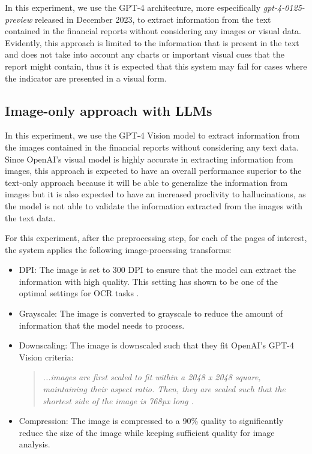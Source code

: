 \documentclass[english, 12pt, a4paper, elec, utf8, a-2b, online]{aaltothesis}
\begin{document}
In this experiment, we use the \ac{GPT}-4 architecture, more especifically \textit{gpt-4-0125-preview} released in December 2023, to extract information from the text contained in the financial reports without considering any images or visual data.
Evidently, this approach is limited to the information that is present in the text and does not take into account any charts or important visual cues that the report might contain, thus it is expected that this system may fail for cases where the indicator are presented in a visual form.

\subsection{Image-only approach with \ac{LLM}s}

In this experiment, we use the \ac{GPT}-4 Vision model to extract information from the images contained in the financial reports without considering any text data.
Since OpenAI's visual model is highly accurate in extracting information from images, this approach is expected to have an overall performance superior to the text-only approach because it will be able to generalize the information from images but it is also expected to have an increased proclivity to hallucinations, as the model is not able to validate the information extracted from the images with the text data.

For this experiment, after the preprocessing step, for each of the pages of interest, the system applies the following image-processing transforms:

\begin{itemize}
\label{list:image_transforms}
    \item DPI: The image is set to 300 DPI to ensure that the model can extract the information with high quality. This setting has shown to be one of the optimal settings for \ac{OCR} tasks \cite{ocr_preprocessing2007}.
    \item Grayscale: The image is converted to grayscale to reduce the amount of information that the model needs to process.
    \item Downscaling: The image is downscaled such that they fit OpenAI's \ac{GPT}-4 Vision criteria:
    \begin{quote}
        \textit{...images are first scaled to fit within a 2048 x 2048 square, maintaining their aspect ratio. Then, they are scaled such that the shortest side of the image is 768px long \cite{OpenAIVisionAPI}.}
    \end{quote}
    \item Compression: The image is compressed to a 90\% quality to significantly reduce the size of the image while keeping sufficient quality for image analysis.
\end{itemize}
\end{document}
